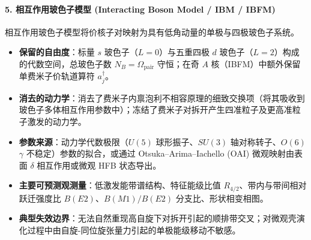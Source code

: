 \paragraph{5. 相互作用玻色子模型 (Interacting Boson Model / IBM / IBFM)}
相互作用玻色子模型将价核子对映射为具有低角动量的单极与四极玻色子系统。\cite{casten_1990_simple-perspective,heyde_1999_basic-ideas-concepts,nomura_2022_Questioningwobbling}
\begin{itemize}
\item \textbf{保留的自由度}：标量 $s$ 玻色子（$L=0$）与五重四极 $d$ 玻色子（$L=2$）构成的代数空间，总玻色子数 $N_B = \Omega_{\mathrm{pair}}$ 守恒；在奇 $A$ 核（IBFM）中额外保留单费米子价轨道算符 $a^\dagger_j$。
\item \textbf{消去的动力学}：消去了费米子内禀泡利不相容原理的细致交换项（将其吸收到玻色子多体相互作用参数中）；冻结了费米子对拆开产生四准粒子及更高准粒子激发的动力学。
\item \textbf{参数来源}：动力学代数极限（$U(5)$ 球形振子、$SU(3)$ 轴对称转子、$O(6)$ $\gamma$ 不稳定）参数的拟合，或通过 Otsuka--Arima--Iachello (OAI) 微观映射由表面 $\delta$ 相互作用或微观 HFB 状态导出。\cite{nomura_2022_Questioningwobbling}
\item \textbf{主要可预测观测量}：低激发能带谱结构、特征能级比值 $R_{4/2}$、带内与带间相对跃迁强度比 $B(E2)$、$B(M1)/B(E2)$ 分支比、形状相变相图。
\item \textbf{典型失效边界}：无法自然重现高自旋下对拆开引起的顺排带交叉；对微观壳演化过程中由自旋-同位旋张量力引起的单极能级移动不敏感。
\end{itemize}

